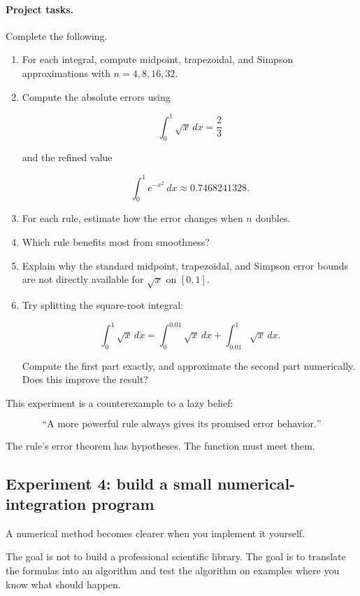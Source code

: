 \paragraph{Project tasks.}
Complete the following.

\begin{enumerate}
\item For each integral, compute midpoint, trapezoidal, and Simpson approximations
with \(n=4,8,16,32\).

\item Compute the absolute errors using

\[
\int_0^1 \sqrt{x}\,dx=\frac23
\]

and the refined value

\[
\int_0^1 e^{-x^2}\,dx\approx0.7468241328.
\]

\item For each rule, estimate how the error changes when \(n\) doubles.

\item Which rule benefits most from smoothness?

\item Explain why the standard midpoint, trapezoidal, and Simpson error bounds are
not directly available for \(\sqrt{x}\) on \([0,1]\).

\item Try splitting the square-root integral:

\[
\int_0^1\sqrt{x}\,dx
=
\int_0^{0.01}\sqrt{x}\,dx+\int_{0.01}^{1}\sqrt{x}\,dx.
\]

Compute the first part exactly, and approximate the second part numerically.  Does this
improve the result?
\end{enumerate}

This experiment is a counterexample to a lazy belief:

\[
\text{``A more powerful rule always gives its promised error behavior.''}
\]

The rule's error theorem has hypotheses.  The function must meet them.

\subsection{Experiment 4: build a small numerical-integration program}
\label{subsec:build-small-numerical-integration-program}

A numerical method becomes clearer when you implement it yourself.

The goal is not to build a professional scientific library.  The goal is to translate the
formulas into an algorithm and test the algorithm on examples where you know what
should happen.

